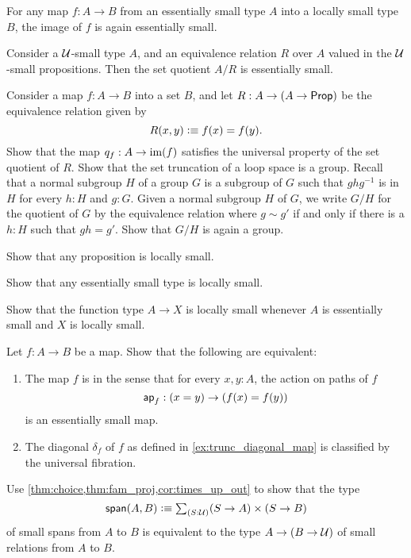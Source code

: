 \begin{thm}\label{thm:replacement}
  For any map $f:A\to B$ from an essentially small type $A$ into a locally small type $B$, the image of $f$ is again essentially small.
\end{thm}

\begin{cor}
  Consider a $\mathcal{U}$-small type $A$, and an equivalence relation $R$ over $A$ valued in the $\mathcal{U}$-small propositions. Then the set quotient $A/R$ is essentially small.
\end{cor}

\begin{exercises}
  \exercise Consider a map $f:A\to B$ into a set $B$, and let $R:A\to(A\to\mathsf{Prop})$ be the equivalence relation given by
  \begin{equation*}
    R(x,y)\vcentcolon\equiv f(x)=f(y).
  \end{equation*}
  Show that the map $q_f:A\to\operatorname{im}(f)$ satisfies the universal property of the set quotient of $R$.
  \exercise Show that the set truncation of a loop space is a group.
  \exercise Recall that a normal subgroup $H$ of a group $G$ is a subgroup of $G$ such that $ghg^{-1}$ is in $H$ for every $h:H$ and $g:G$. Given a normal subgroup $H$ of $G$, we write $G/H$ for the quotient of $G$ by the equivalence relation where $g\sim g'$ if and only if there is a $h:H$ such that $gh=g'$. Show that $G/H$ is again a group. 
\exercise
\begin{subexenum}
\item Show that any proposition is locally small.
\item Show that any essentially small type is locally small.
\item Show that the function type $A\to X$ is locally small whenever $A$ is essentially small and $X$ is locally small.
\end{subexenum}
\exercise Let $f:A\to B$ be a map. Show that the following are equivalent:
\begin{enumerate}
\item The map $f$ is  in the sense that for every $x,y:A$, the action on paths of $f$
\begin{equation*}
\mathsf{ap}_{f}:(x=y)\to (f(x)=f(y))
\end{equation*}
is an essentially small map.
\item The diagonal $\delta_f$ of $f$ as defined in \cref{ex:trunc_diagonal_map} is classified by the universal fibration.
\end{enumerate}
\exercise \label{ex:span_rel}Use \cref{thm:choice,thm:fam_proj,cor:times_up_out} to show that the type 
\begin{equation*}
\mathsf{span}(A,B)\defeq \sm{S:\UU} (S\to A)\times (S\to B)
\end{equation*}
of small spans from $A$ to $B$ is equivalent to the type $A\to (B\to\mathcal{U})$ of small relations from $A$ to $B$.
\end{exercises}

